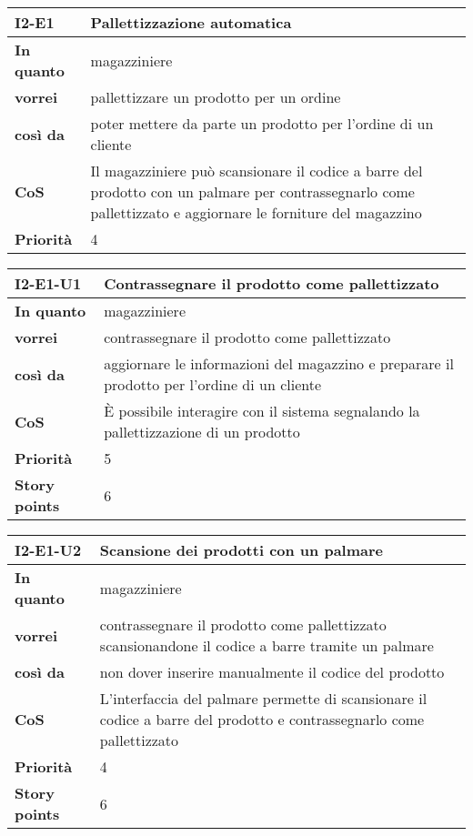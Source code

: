 \begin{table}[H]
  \begin{tabularx}{\textwidth}{lX}
    \toprule
    \textbf{I2-E1} & \textbf{Pallettizzazione automatica} \\
    \midrule
    \textbf{In quanto} & magazziniere \\
    \textbf{vorrei} & pallettizzare un prodotto per un ordine \\
    \textbf{così da} & poter mettere da parte un prodotto per l'ordine di un cliente \\
    \midrule
    \textbf{CoS} & Il magazziniere può scansionare il codice a barre del prodotto con un palmare per contrassegnarlo come pallettizzato e aggiornare le forniture del magazzino \\
    \midrule
    \textbf{Priorità} & 4 \\
    \bottomrule
  \end{tabularx}
  \label{user-story:i2-e1}
\end{table}

\begin{table}[H]
  \begin{tabularx}{\textwidth}{lX}
    \toprule
    \textbf{I2-E1-U1} & \textbf{Contrassegnare il prodotto come pallettizzato} \\
    \midrule
    \textbf{In quanto} & magazziniere \\
    \textbf{vorrei} & contrassegnare il prodotto come pallettizzato \\
    \textbf{così da} & aggiornare le informazioni del magazzino e preparare il prodotto per l'ordine di un cliente \\
    \midrule
    \textbf{CoS} & È possibile interagire con il sistema segnalando la pallettizzazione di un prodotto \\
    \midrule
    \textbf{Priorità} & 5 \\
    \textbf{Story points} & 6 \\
    \bottomrule
  \end{tabularx}
  \label{user-story:i2-e1-u1}
\end{table}

\begin{table}[H]
  \begin{tabularx}{\textwidth}{lX}
    \toprule
    \textbf{I2-E1-U2} & \textbf{Scansione dei prodotti con un palmare} \\
    \midrule
    \textbf{In quanto} & magazziniere \\
    \textbf{vorrei} & contrassegnare il prodotto come pallettizzato scansionandone il codice a barre tramite un palmare \\
    \textbf{così da} & non dover inserire manualmente il codice del prodotto \\
    \midrule
    \textbf{CoS} & L'interfaccia del palmare permette di scansionare il codice a barre del prodotto e contrassegnarlo come pallettizzato \\
    \midrule
    \textbf{Priorità} & 4 \\
    \textbf{Story points} & 6 \\
    \bottomrule
  \end{tabularx}
  \label{user-story:i2-e1-u2}
\end{table}

